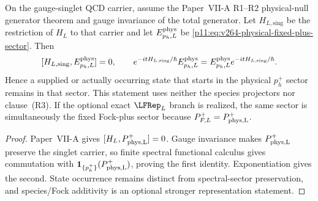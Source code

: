 \documentclass[12pt,a4paper]{article}
\begin{document}
\begin{theorem}
\label{p11:thm:v134-fixed-plus-sector-preservation}
On the gauge-singlet QCD carrier, assume the Paper~VII-A R1--R2 physical-null
generator theorem and gauge invariance of the total generator.  Let
\(H_{L,\mathrm{sing}}\) be the restriction of \(H_L\) to that carrier and let
\(E^{\rm phys}_{p_h,L}\) be
\eqref{p11:eq:v264-physical-fixed-plus-sector}.  Then
\begin{equation}
\label{p11:eq:v134-fixed-plus-sector-preservation}
 [H_{L,\mathrm{sing}},E^{\rm phys}_{p_h,L}]=0,
 \qquad
 e^{-itH_{L,\mathrm{sing}}/\hbar}E^{\rm phys}_{p_h,L}
 =E^{\rm phys}_{p_h,L}e^{-itH_{L,\mathrm{sing}}/\hbar}.
\end{equation}
Hence a supplied or actually occurring state that starts in the physical
\(p_h^+\) sector remains in that sector.  This statement uses neither the
species projectors nor clause~\textnormal{(R3)}.  If the optional exact
\(\LFRep_L\) branch is realized, the same sector is simultaneously the fixed
Fock-plus sector because \(P_{F,L}^+=P_{\rm phys,L}^+\).
\end{theorem}
\begin{proof}
Paper~VII-A gives \([H_L,P_{\rm phys,L}^+]=0\).  Gauge invariance makes
\(P_{\rm phys,L}^+\) preserve the singlet carrier, so finite spectral functional
calculus gives commutation with
\(\mathbf1_{\{p_h^+\}}(P_{\rm phys,L}^+)\), proving the first identity.
Exponentiation gives the second.  State occurrence remains distinct from
spectral-sector preservation, and species/Fock additivity is an optional
stronger representation statement.
\end{proof}
\end{document}
